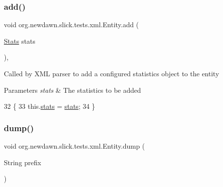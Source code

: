 \subsubsection{\texorpdfstring{add()}{add()}\hspace{0.1cm}{\footnotesize\ttfamily [2/2]}}
{\footnotesize\ttfamily void org.\+newdawn.\+slick.\+tests.\+xml.\+Entity.\+add (\begin{DoxyParamCaption}\item[{\mbox{\hyperlink{classorg_1_1newdawn_1_1slick_1_1tests_1_1xml_1_1_stats}{Stats}}}]{stats }\end{DoxyParamCaption})\hspace{0.3cm}{\ttfamily [inline]}, {\ttfamily [private]}}

Called by X\+ML parser to add a configured statistics object to the entity


\begin{DoxyParams}{Parameters}
{\em stats} & The statistics to be added \\
\hline
\end{DoxyParams}

\begin{DoxyCode}
32                                   \{
33         this.\mbox{\hyperlink{classorg_1_1newdawn_1_1slick_1_1tests_1_1xml_1_1_entity_ab3afbe872882f8df21ceaea027b85ffb}{stats}} = \mbox{\hyperlink{classorg_1_1newdawn_1_1slick_1_1tests_1_1xml_1_1_entity_ab3afbe872882f8df21ceaea027b85ffb}{stats}};
34     \}
\end{DoxyCode}
\mbox{\label{classorg_1_1newdawn_1_1slick_1_1tests_1_1xml_1_1_entity_a9b7da9305e7a8efcc31042a65170cec2}} 
\subsubsection{\texorpdfstring{dump()}{dump()}}
{\footnotesize\ttfamily void org.\+newdawn.\+slick.\+tests.\+xml.\+Entity.\+dump (\begin{DoxyParamCaption}\item[{String}]{prefix }\end{DoxyParamCaption})\hspace{0.3cm}{\ttfamily [inline]}}

